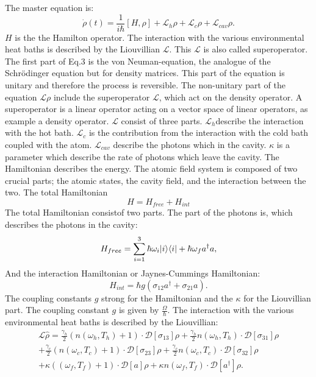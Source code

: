 \documentclass[12pt,a4paper]{article}
\DeclarePairedDelimiter\bra{\langle}{\rvert}
\DeclarePairedDelimiter\ket{\lvert}{\rangle}
\begin{document}
The master equation is:
\begin{equation}
\dot{\rho}(t)=\frac{1}{i \hbar}[H,\rho]+ \mathcal{L}_{h}\rho+ \mathcal{L}_{c}\rho+ \mathcal{L}_{cav}\rho.\label{eins}
\end{equation}
$H$ is the the Hamilton operator. The interaction with the various environmental heat baths is described by the Liouvillian $\mathcal{L}$. This $\mathcal{L}$ is also called superoperator. 
The first part of Eq.3 is the von Neuman-equation,  the analogue of the Schrödinger equation but for density matrices. This part of the equation is unitary and therefore the process is reversible.
The non-unitary part of the equation $\mathcal{L}\rho$ include the superoperator $\mathcal{L}$, which act on the density operator.  A superoperator is a linear operator acting on a vector space of linear operators, as example a density operator.
$\mathcal{L}$ consist of three parts. $\mathcal{L}_h $describe the interaction with the hot bath.
$\mathcal{L}_c$ is the contribution from the interaction with the cold bath coupled with the atom.
$\mathcal{L}_{cav}$ describe the photons which in the cavity. $\kappa$ is a parameter which describe the rate of photons which leave the cavity.
The Hamiltonian describes the energy. 
The atomic field system is composed of two crucial 
parts; the atomic states, the cavity field, and the interaction between the two.
The total Hamiltonian
\begin{equation}
H=H_{free}+H_{int}
\end{equation}
The total Hamiltonian consistof two parts. The part of the photons is, which describes the photons in the cavity:
\begin{equation}
H_{free}=\sum_{i=1}^3 \hbar \omega_i \ket{i}\bra{i}+\hbar \omega_f a^{\dag}a,
\end{equation}
And the interaction Hamiltonian or Jaynes-Cummings Hamiltonian:
\begin{equation}
H_{int}=\hbar g(\sigma_{12}a^{\dag}+\sigma_{21}a).
\end{equation}
The coupling constants $g$ strong for the Hamiltonian and the $\kappa$ for the Liouvillian part. 
The coupling constant $g$ is given by $\frac{\Omega}{\hbar}$.
\newpage
The interaction with the various environmental heat baths is described by the Liouvillian:
\begin{equation}
\begin{aligned}
\mathcal{L}\hat{\rho}=\frac{\gamma_h}{2}(n(\omega_h,T_h)+1)   \cdot \mathcal{D}[\sigma_{13}]\rho
+\frac{\gamma_h}{2}n(\omega_h,T_h)\cdot \mathcal{D}[\sigma_{31}]\rho \\
+\frac{\gamma_c}{2}(n(\omega_c,T_c)+1)\cdot \mathcal{D}[\sigma_{23}]\rho
+\frac{\gamma_c}{2}n(\omega_c,T_c) \cdot \mathcal{D}[\sigma_{32}]\rho \\
+\kappa((\omega_f,T_f)+1)	\cdot\mathcal{D}[a]\rho+
\kappa n(\omega_f,T_f)\cdot \mathcal{D}[a^{\dag}]\rho.
\end{aligned}
\end{equation}
\end{document}
